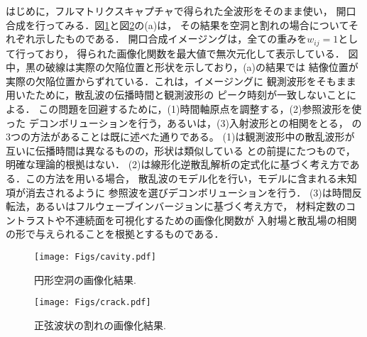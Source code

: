 はじめに，フルマトリクスキャプチャで得られた全波形をそのまま使い，
開口合成を行ってみる．図\ref{fig:cavity}と図\ref{fig:crack}の(a)は，
その結果を空洞と割れの場合についてそれぞれ示したものである．
開口合成イメージングは，全ての重みを$w_{ij}=1$として行っており，
得られた画像化関数を最大値で無次元化して表示している．
図中，黒の破線は実際の欠陥位置と形状を示しており，(a)の結果では
結像位置が実際の欠陥位置からずれている．これは，イメージングに
観測波形をそもまま用いたために，散乱波の伝播時間と観測波形の
ピーク時刻が一致しないことによる．
この問題を回避するために，(1)時間軸原点を調整する，(2)参照波形を使った
デコンボリューションを行う，あるいは，(3)入射波形との相関をとる，
の3つの方法があることは既に述べた通りである。
(1)は観測波形中の散乱波形が互いに伝播時間は異なるものの，形状は類似している
との前提にたつもので，明確な理論的根拠はない．
(2)は線形化逆散乱解析の定式化に基づく考え方である．この方法を用いる場合，
散乱波のモデル化を行い，モデルに含まれる未知項が消去されるように
参照波を選びデコンボリューションを行う．
(3)は時間反転法，あるいはフルウェーブインバージョンに基づく考え方で，
材料定数のコントラストや不連続面を可視化するための画像化関数が
入射場と散乱場の相関の形で与えられることを根拠とするものである．


\begin{figure}[h]
	\begin{center}
	\texttt{[image: Figs/cavity.pdf]} 
	\end{center}
	\caption{円形空洞の画像化結果.} 
	\label{fig:cavity}
\end{figure}
\begin{figure}[h]
	\begin{center}
	\texttt{[image: Figs/crack.pdf]} 
	\end{center}
	\caption{正弦波状の割れの画像化結果.} 
	\label{fig:crack}
\end{figure}
